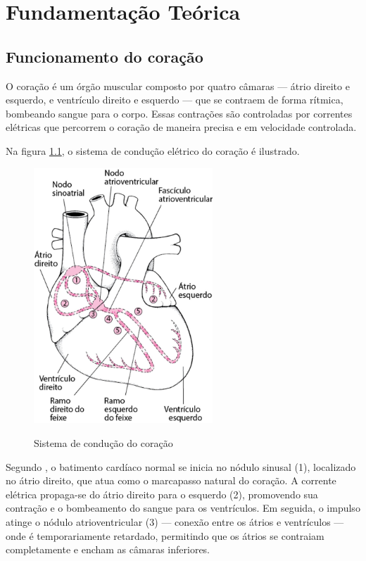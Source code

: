 \chapter{Fundamentação Teórica}

\section{Funcionamento do coração}
\label{sec:funciionamento_coracao}

O coração é um órgão muscular composto por quatro câmaras — átrio direito e esquerdo, e ventrículo direito e esquerdo — que se contraem de forma rítmica, bombeando sangue para o corpo. Essas contrações são controladas por correntes elétricas que percorrem o coração de maneira precisa e em velocidade controlada.

Na figura \ref{fig:coracao_esquema_eletrico}, o sistema de condução elétrico do coração é ilustrado.

\begin{figure}[H]
  \centering
  \caption{Sistema de condução do coração}
   \includegraphics[width=0.6\textwidth]{figuras/coracao_sistema_eletrico.png} %
  \label{fig:coracao_esquema_eletrico}
\end{figure}

Segundo , o batimento cardíaco normal se inicia no nódulo sinusal (1), localizado no átrio direito, que atua como o marcapasso natural do coração. A corrente elétrica propaga-se do átrio direito para o esquerdo (2), promovendo sua contração e o bombeamento do sangue para os ventrículos. Em seguida, o impulso atinge o nódulo atrioventricular (3) — conexão entre os átrios e ventrículos — onde é temporariamente retardado, permitindo que os átrios se contraiam completamente e encham as câmaras inferiores.

